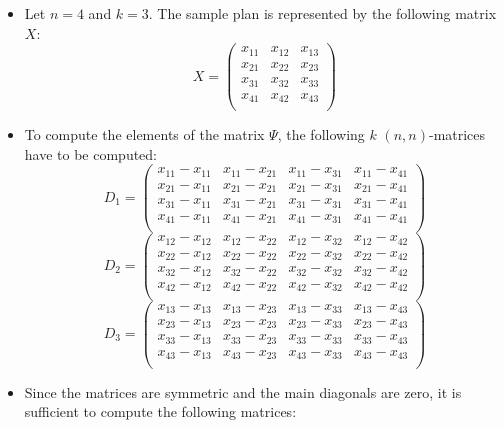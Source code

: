 \documentclass[
  letterpaper,
  DIV=11,
  numbers=noendperiod]{scrreprt}
\begin{document}
\begin{itemize}
\item
  Let \(n=4\) and \(k=3\). The sample plan is represented by the
  following matrix \(X\):
  \[X = \begin{pmatrix} x_{11} & x_{12} & x_{13}\\ x_{21} & x_{22} & x_{23}\\ x_{31} & x_{32} & x_{33}\\ x_{41} & x_{42} & x_{43}\\ \end{pmatrix}\]
\item
  To compute the elements of the matrix \(\Psi\), the following \(k\)
  \((n,n)\)-matrices have to be computed:
  \[ D_1 = \begin{pmatrix} x_{11} - x_{11} & x_{11} - x_{21} & x_{11} -x_{31} & x_{11} - x_{41} \\  x_{21} - x_{11} & x_{21} - x_{21} & x_{21} -x_{31} & x_{21} - x_{41} \\ x_{31} - x_{11} & x_{31} - x_{21} & x_{31} -x_{31} & x_{31} - x_{41} \\ x_{41} - x_{11} & x_{41} - x_{21} & x_{41} -x_{31} & x_{41} - x_{41} \\\end{pmatrix}\]
  \[ D_2 = \begin{pmatrix} x_{12} - x_{12} & x_{12} - x_{22} & x_{12} -x_{32} & x_{12} - x_{42} \\  x_{22} - x_{12} & x_{22} - x_{22} & x_{22} -x_{32} & x_{22} - x_{42} \\ x_{32} - x_{12} & x_{32} - x_{22} & x_{32} -x_{32} & x_{32} - x_{42} \\ x_{42} - x_{12} & x_{42} - x_{22} & x_{42} -x_{32} & x_{42} - x_{42} \\\end{pmatrix}\]
  \[ D_3 = \begin{pmatrix} x_{13} - x_{13} & x_{13} - x_{23} & x_{13} -x_{33} & x_{13} - x_{43} \\  x_{23} - x_{13} & x_{23} - x_{23} & x_{23} -x_{33} & x_{23} - x_{43} \\ x_{33} - x_{13} & x_{33} - x_{23} & x_{33} -x_{33} & x_{33} - x_{43} \\ x_{43} - x_{13} & x_{43} - x_{23} & x_{43} -x_{33} & x_{43} - x_{43} \\\end{pmatrix}\]
\item
  Since the matrices are symmetric and the main diagonals are zero, it
  is sufficient to compute the following matrices:

\end{itemize}
\end{document}
